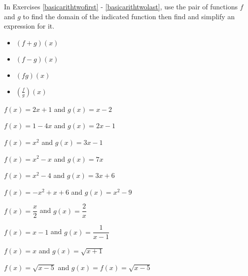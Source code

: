 \documentclass{ximera}
\begin{document}
\begin{question}
In Exercises \ref{basicarithtwofirst} - \ref{basicarithtwolast}, use the pair of functions $f$ and $g$ to find the domain of the indicated function then find and simplify an expression for it.
\begin{itemize}
\item  $(f+g)(x)$
\item  $(f-g)(x)$
\item  $(fg)(x)$
\item  $\left(\frac{f}{g}\right)(x)$
\end{itemize}

\begin{problem}\label{basicarithtwofirst}
$f(x) = 2x+1$ and $g(x) = x-2$ 
\end{problem}

\begin{problem}
$f(x) = 1-4x$ and $g(x) = 2x-1$
\end{problem}

\begin{problem}
$f(x) = x^2$ and $g(x) = 3x-1$
\end{problem}

\begin{problem}
$f(x) = x^2-x$ and $g(x) = 7x$
\end{problem}

\begin{problem}
$f(x) = x^2-4$ and $g(x) = 3x+6$
\end{problem} 

\begin{problem}
$f(x) = -x^2+x+6$ and $g(x) = x^2-9$
\end{problem} 

\begin{problem}
$f(x) = \dfrac{x}{2}$ and $g(x) = \dfrac{2}{x}$
\end{problem} 

\begin{problem}
$f(x) =x-1$ and $g(x) = \dfrac{1}{x-1}$
\end{problem}

\begin{problem}
$f(x) = x$ and $g(x) = \sqrt{x+1}$
\end{problem}

\begin{problem}\label{basicarithtwolast}
$f(x) =\sqrt{x-5}$ and $g(x) = f(x) = \sqrt{x-5}$
\end{problem}

\end{question}
\end{document}
